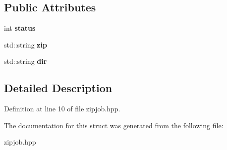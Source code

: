 \subsection*{Public Attributes}
\begin{DoxyCompactItemize}
\item 
\hypertarget{struct_zip_job_a77647773a25c5da19ffaaaba604a37d2}{int {\bfseries status}}\label{struct_zip_job_a77647773a25c5da19ffaaaba604a37d2}

\item 
\hypertarget{struct_zip_job_afb568c60d3dabe2f93b16e4e7c8acf33}{std\-::string {\bfseries zip}}\label{struct_zip_job_afb568c60d3dabe2f93b16e4e7c8acf33}

\item 
\hypertarget{struct_zip_job_a8e14689c742b93415d6e5e58eda28b77}{std\-::string {\bfseries dir}}\label{struct_zip_job_a8e14689c742b93415d6e5e58eda28b77}

\end{DoxyCompactItemize}


\subsection{Detailed Description}


Definition at line 10 of file zipjob.\-hpp.



The documentation for this struct was generated from the following file\-:\begin{DoxyCompactItemize}
\item 
zipjob.\-hpp\end{DoxyCompactItemize}
